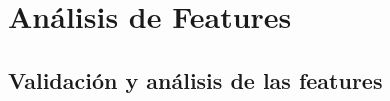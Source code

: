 \chapter{Análisis de Features}
\label{ch:analisis_features}

\section{Validación y análisis de las features}
\label{sec:validacion_features}

%
%
%
%
